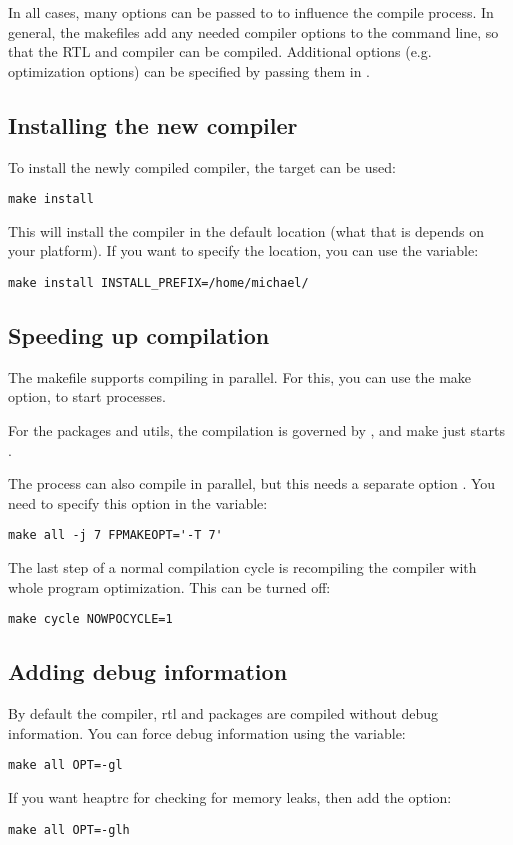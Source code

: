In all cases, many options can be passed to  to influence the
compile process. In general, the makefiles add any needed compiler options
to the command line, so that the RTL and compiler can be compiled. 
Additional options (e.g. optimization options) can be specified by passing them in
.

\subsection{Installing the new compiler}

To install the newly compiled compiler, the  target can be
used:
\begin{verbatim}
make install
\end{verbatim}

This will install the compiler in the default location (what that is depends
on your platform). If you want to specify the location, you can use the
 variable:
\begin{verbatim}
make install INSTALL_PREFIX=/home/michael/
\end{verbatim}

\subsection{Speeding up compilation}

The makefile supports compiling in parallel. For this, you can use the  
make option, to start  processes. 

For the packages and utils, the compilation is governed by , and make 
just starts . 

The  process can also compile in parallel, but this needs a separate option 
. You need to specify this option in the
 variable:
\begin{verbatim}
make all -j 7 FPMAKEOPT='-T 7'
\end{verbatim}

The last step of a normal compilation cycle is recompiling the compiler with
whole program optimization. This can be turned off:
\begin{verbatim}
make cycle NOWPOCYCLE=1
\end{verbatim}

\subsection{Adding debug information}
By default the compiler, rtl and packages are compiled without debug
information.  You can force debug information using the  variable:
\begin{verbatim}
make all OPT=-gl
\end{verbatim}
If you want heaptrc for checking for memory leaks, then add the  option:
\begin{verbatim}
make all OPT=-glh
\end{verbatim}

